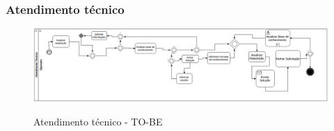 \subsubsection{Atendimento técnico}
\begin{figure}[!h]
\caption{Atendimento técnico - TO-BE}
\centering %
\includegraphics[width=15cm]{to_be/02_atendimento_tecnico.png}
\label{figura:suporte_tecnico_to_be}
\end{figure}

